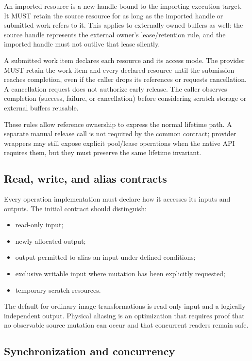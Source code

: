 \documentclass[11pt,a4paper,oneside]{article}
\begin{document}
An imported resource is a new handle bound to the importing execution target. It MUST retain the source resource for as long as the imported handle or submitted work refers to it. This applies to externally owned buffers as well: the source handle represents the external owner's lease/retention rule, and the imported handle must not outlive that lease silently.

A submitted work item declares each resource and its access mode. The provider MUST retain the work item and every declared resource until the submission reaches completion, even if the caller drops its references or requests cancellation. A cancellation request does not authorize early release. The caller observes completion (success, failure, or cancellation) before considering scratch storage or external buffers reusable.

These rules allow reference ownership to express the normal lifetime path. A separate manual release call is not required by the common contract; provider wrappers may still expose explicit pool/lease operations when the native API requires them, but they must preserve the same lifetime invariant.

\subsection{Read, write, and alias contracts}

Every operation implementation must declare how it accesses its inputs and outputs. The initial contract should distinguish:
\begin{itemize}
  \item read-only input;
  \item newly allocated output;
  \item output permitted to alias an input under defined conditions;
  \item exclusive writable input where mutation has been explicitly requested;
  \item temporary scratch resources.
\end{itemize}

The default for ordinary image transformations is read-only input and a logically independent output. Physical aliasing is an optimization that requires proof that no observable source mutation can occur and that concurrent readers remain safe.

\subsection{Synchronization and concurrency}
\end{document}
